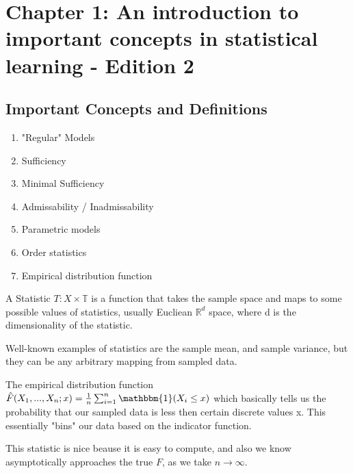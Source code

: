 
\section{Chapter 1: An introduction to important concepts in statistical learning - Edition 2}
  \label{sec:chapterone_v2}
  \subsection{Important Concepts and Definitions}
  	\begin{enumerate}
      \item "Regular" Models
  		\item Sufficiency
  		\item Minimal Sufficiency
      \item Admissability / Inadmissability
      \item Parametric models
      \item Order statistics
      \item Empirical distribution function
  	\end{enumerate}

    \begin{definition}{A Statistic}
    $T : X \times \mathbb{T}$ is a function that takes the sample space and maps to some possible values of statistics, usually Eucliean $\mathbb{R}^d$ space, where d is the dimensionality of the statistic.
    \end{definition}

    Well-known examples of statistics are the sample mean, and sample variance, but they can be any arbitrary mapping from sampled data.

    \begin{definition}{The empirical distribution function}
    $\hat{F}(X_1, ..., X_n; x) = \frac{1}{n} \sum_{i=1}^n \mathbbm{1}(X_i \le x)$ which basically tells us the probability that our sampled data is less then certain discrete values x. This essentially "bins" our data based on the indicator function.
    \end{definition}

    This statistic is nice beause it is easy to compute, and also we know asymptotically approaches the true $F$, as we take $n \rightarrow \infty$.

